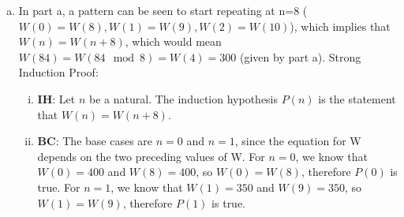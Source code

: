 \documentclass[12pt]{article}
\begin{document}
\begin{enumerate}[(a)]
\begin{enumerate}[(i)]
				\item \textbf{IS}: Assume that $P(k)$ is true for all natural numbers $k$
					where $0\leq k\leq n$ and $n\geq 1$. We want to prove $P(n+1)$ is true
					(that $W(n+1)=a_{n+1}+b_{n+1}\sqrt{2}$ where $a_{n+1}$ and $b_{n+1}$ are
					integers). By the induction hypothesis, we know that
					$W(n)=a_{n}+b_{n}\sqrt{2}$ and $W(n-1)=a_{n-1}+b_{n-1}\sqrt{2}$, where
					all the coefficients are integers. Plugging these into the equation
					for W gives:
					\begin{align*}
						W(n+1) & = \sqrt{2}W(n)-W(n-1)+700-350\sqrt{2}                                     \\
						       & = \sqrt{2}(a_{n}+b_{n}\sqrt{2})-(a_{n-1}+b_{n-1}\sqrt{2})+700-350\sqrt{2} \\
						       & = 2b_{n}-a_{n-1}+700+(a_{n}-b_{n-1}-350)\sqrt{2}.
					\end{align*}
					Since $a_{n},b_{n},a_{n-1},b_{n-1}$ are all integers, both
					$2b_{n}-a_{n-1}+700$ and $a_{n}-b_{n-1}-350$ must also be integers. Therefore,
					$W(n+1)$ can be expressed in the form $a_{n+1}+b_{n+1}\sqrt{2}$, where
					$a_{n+1}$ and $b_{n+1}$ are integers. Therefore, $P(n+1)$ is true,
					which completes the inductive step.
			\end{enumerate}

		\item In part a, a pattern can be seen to start repeating at n=8 ($W(0)=W(8),
			W(1)=W(9), W(2)=W(10)$), which implies that $W(n)=W(n+8)$, which would
			mean $W(84)=W(84\mod{8})=W(4)=300$ (given by part a). Strong Induction Proof:
			\begin{enumerate}[(i)]
				\item \textbf{IH}: Let $n$ be a natural. The induction hypothesis $P(n)$
					is the statement that $W(n)=W(n+8)$.

				\item \textbf{BC}: The base cases are $n=0$ and $n=1$, since the
					equation for W depends on the two preceding values of W. For $n=0$, we
					know that $W(0)=400$ and $W(8)=400$, so $W(0)=W(8)$, therefore $P(0)$
					is true. For $n=1$, we know that $W(1)=350$ and $W(9)=350$, so $W(1)=W(
					9)$, therefore $P(1)$ is true.


\end{enumerate}
\end{enumerate}
\end{document}
